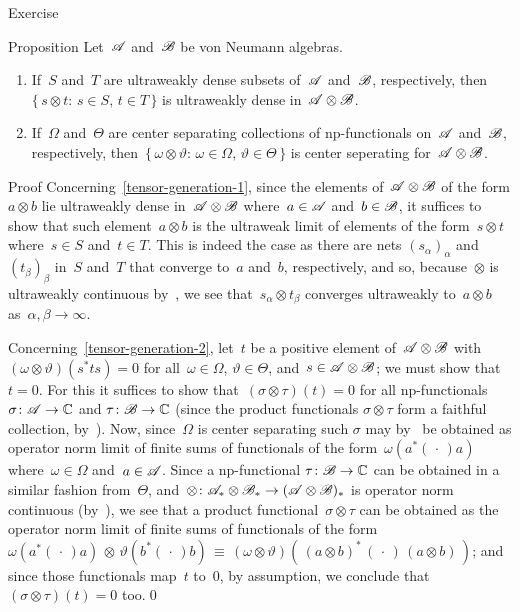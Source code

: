 \documentclass[a]{subfiles}
\begin{document}
\begin{parsec}
\begin{point}{Exercise}
\begin{enumerate}
\end{enumerate}
\end{point}
\begin{point}{Proposition}
Let~$\mathscr{A}$ and~$\mathscr{B}$ 
be von Neumann algebras.
\begin{enumerate}
\item
\label{tensor-generation-1}
If~$S$ and~$T$ are ultraweakly dense subsets of~$\mathscr{A}$
and~$\mathscr{B}$, respectively,
then~$\{\,s\otimes t\colon\,s\in S,\,t\in T\,\}$
is ultraweakly dense in~$\mathscr{A}\otimes\mathscr{B}$.
\item
\label{tensor-generation-2}
If~$\Omega$ and~$\Theta$ are center separating collections
of np-functionals on~$\mathscr{A}$ and~$\mathscr{B}$, respectively,
then~$\{\,\omega\otimes\vartheta\colon\, 
\omega\in\Omega,\,\vartheta\in\Theta\,\}$
is center seperating for~$\mathscr{A}\otimes\mathscr{B}$.
\end{enumerate}
\begin{point}{Proof}%
Concerning~\ref{tensor-generation-1},
since the elements of~$\mathscr{A}\otimes\mathscr{B}$
of the form $a\otimes b$
lie ultraweakly dense in~$\mathscr{A}\otimes\mathscr{B}$ 
where~$a\in\mathscr{A}$ and~$b\in\mathscr{B}$,
it suffices to show that such element~$a\otimes b$
is the ultraweak limit of elements of the form~$s\otimes t$
where~$s\in S$ and~$t\in T$.
This is indeed the case
as there are nets $(s_\alpha)_\alpha$
and~$(t_\beta)_\beta$ in~$S$ and~$T$
that converge to~$a$ and~$b$, respectively,
and so, 
because~$\otimes$ is ultraweakly continuous by~,
we see that~$s_\alpha\otimes t_\beta$
converges ultraweakly to~$a\otimes b$
as~$\alpha,\beta\to\infty$.

Concerning~\ref{tensor-generation-2},
let~$t$ be a positive element of~$\mathscr{A}\otimes \mathscr{B}$
with $(\omega\otimes \vartheta)(s^*ts)=0$
for all~$\omega\in\Omega$, $\vartheta\in\Theta$,
and~$s\in\mathscr{A}\otimes \mathscr{B}$;
we must show that~$t=0$.
For this it suffices
to show that~$(\sigma\otimes\tau)(t)=0$
for all np-functionals  $\sigma\colon \mathscr{A}\to\mathbb{C}$
and 
$\tau\colon\mathscr{B}\to\mathbb{C}$
(since the product functionals $\sigma\otimes\tau$
form a faithful collection, by~).
Now, since~$\Omega$ is center separating
such $\sigma$ may by~ be obtained
as operator norm limit of finite sums
of functionals of the
form~$\omega(a^*(\,\cdot\,)a)$
where~$\omega\in\Omega$ and~$a \in\mathscr{A}$.
Since a np-functional $\tau\colon \mathscr{B}\to\mathbb{C}$ 
can be obtained in a similar fashion
from~$\Theta$,
and~$\otimes \colon \mathscr{A}_*\otimes \mathscr{B}_*\to(\mathscr{A}\otimes\mathscr{B})_*$
is operator norm continuous (by~),
we see that a product functional~$\sigma\otimes \tau$
can be obtained as the operator norm limit
of finite sums of functionals
of the form $\omega(a^*(\,\cdot\,)a)\,\otimes\,
\vartheta(b^*(\,\cdot\,)b)
\,\equiv\, (\omega\otimes\vartheta)(\,(a\otimes b)^*\,(\,\cdot\,)
\,(a\otimes b)\,)$;
and since those functionals 
map~$t$ to~$0$,
by assumption,
we conclude that~$(\sigma\otimes \tau)(t)=0$ too.\qed
\end{point}
\end{point}
\end{parsec}
\end{document}
